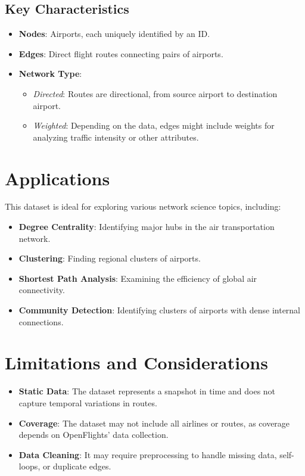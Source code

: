 \documentclass[12pt]{article}
\begin{document}
\subsection{Key Characteristics}
\begin{itemize}
    \item \textbf{Nodes}: Airports, each uniquely identified by an ID.
    \item \textbf{Edges}: Direct flight routes connecting pairs of airports.
    \item \textbf{Network Type}:
    \begin{itemize}
        \item \textit{Directed}: Routes are directional, from source airport to destination airport.
        \item \textit{Weighted}: Depending on the data, edges might include weights for analyzing traffic intensity or other attributes.
    \end{itemize}
\end{itemize}



\section{Applications}

This dataset is ideal for exploring various network science topics, including:
\begin{itemize}
    \item \textbf{Degree Centrality}: Identifying major hubs in the air transportation network.
    \item \textbf{Clustering}: Finding regional clusters of airports.
    \item \textbf{Shortest Path Analysis}: Examining the efficiency of global air connectivity.
    \item \textbf{Community Detection}: Identifying clusters of airports with dense internal connections.
\end{itemize}



\section{Limitations and Considerations}

\begin{itemize}
    \item \textbf{Static Data}: The dataset represents a snapshot in time and does not capture temporal variations in routes.
    \item \textbf{Coverage}: The dataset may not include all airlines or routes, as coverage depends on OpenFlights’ data collection.
    \item \textbf{Data Cleaning}: It may require preprocessing to handle missing data, self-loops, or duplicate edges.
\end{itemize}
\end{document}

